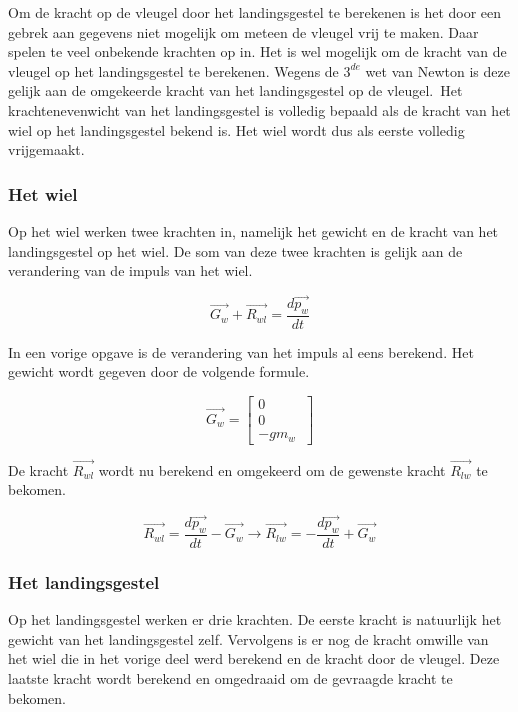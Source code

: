 Om de kracht op de vleugel door het landingsgestel te berekenen is het door een gebrek aan gegevens niet mogelijk om meteen de vleugel vrij te maken. Daar spelen te veel onbekende krachten op in. Het is wel mogelijk om de kracht van de vleugel op het landingsgestel te berekenen. Wegens de $3^{de}$ wet van Newton is deze gelijk aan de omgekeerde kracht van het landingsgestel op de vleugel.\
Het krachtenevenwicht van het landingsgestel is volledig bepaald als de kracht van het wiel op het landingsgestel bekend is. Het wiel wordt dus als eerste volledig vrijgemaakt.

\subsubsection{Het wiel}
Op het wiel werken twee krachten in, namelijk het gewicht en de kracht van het landingsgestel op het wiel. De som van deze twee krachten is gelijk aan de verandering van de impuls van het wiel.

\begin{equation}
\overrightarrow{G_{w}}+\overrightarrow{R_{wl}}=\frac{d\overrightarrow{p_{w}}}{dt}
\end{equation}

In een vorige opgave is de verandering van het impuls al eens berekend. Het gewicht wordt gegeven door de volgende formule.

\begin{equation*}
\overrightarrow{G_{w}}
=	\begin{bmatrix}
	0\\
	0\\
	-gm_{w}\
	\end{bmatrix}
\end{equation*}

De kracht $\overrightarrow{R_{wl}}$ wordt nu berekend en omgekeerd om de gewenste kracht $\overrightarrow{R_{lw}}$ te bekomen.

\begin{equation*}
\overrightarrow{R_{wl}} =\frac{d\overrightarrow{p_{w}}}{dt}-\overrightarrow{G_{w}}
\longrightarrow\overrightarrow{R_{lw}}=-\frac{d\overrightarrow{p_{w}}}{dt}+\overrightarrow{G_{w}}
\end{equation*}


\subsubsection{Het landingsgestel}
Op het landingsgestel werken er drie krachten. De eerste kracht is natuurlijk het gewicht van het landingsgestel zelf. Vervolgens is er nog de kracht omwille van het wiel die in het vorige deel werd berekend en de kracht door de vleugel. Deze laatste kracht wordt berekend en omgedraaid om de gevraagde kracht te bekomen.

